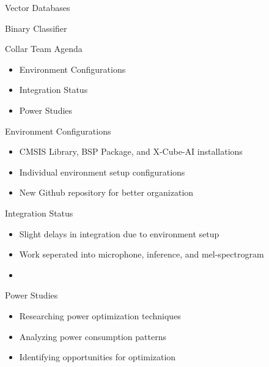 \begin{frame}{Vector Databases}
    
\end{frame}

\begin{frame}{Binary Classifier}
    
\end{frame}

\begin{frame}{Collar Team Agenda}
    \begin{itemize}
        \item Environment Configurations
        \item Integration Status
        \item Power Studies
    \end{itemize}
\end{frame}

\begin{frame}{Environment Configurations}
    \begin{itemize}
        \item CMSIS Library, BSP Package, and X-Cube-AI installations
        \item Individual environment setup configurations
        \item New Github repository for better organization
    \end{itemize}
\end{frame}

\begin{frame}{Integration Status}
    \begin{itemize}
        \item Slight delays in integration due to environment setup
        \item Work seperated into microphone, inference, and mel-spectrogram
        \item 
    \end{itemize}   
\end{frame}

\begin{frame}{Power Studies}
    \begin{itemize}
        \item Researching power optimization techniques
        \item Analyzing power consumption patterns
        \item Identifying opportunities for optimization
    \end{itemize}
\end{frame}

